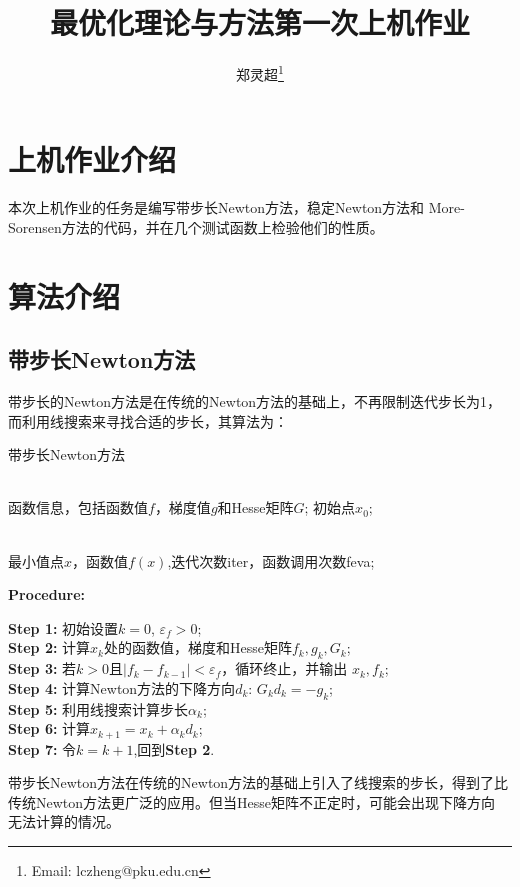 \documentclass[a4paper,  11pt]{ctexart}
\begin{document}
\title{最优化理论与方法第一次上机作业}
\author{郑灵超\thanks{Email: lczheng@pku.edu.cn}}
\maketitle
\section{上机作业介绍}
本次上机作业的任务是编写带步长Newton方法，稳定Newton方法和
More-Sorensen方法的代码，并在几个测试函数上检验他们的性质。
\section{算法介绍}
\subsection{带步长Newton方法}
带步长的Newton方法是在传统的Newton方法的基础上，不再限制迭代步长为1，
而利用线搜索来寻找合适的步长，其算法为：
\begin{algorithm}[H]
\caption{带步长Newton方法}
\begin{algorithmic}[2]
\REQUIRE ~~\\
函数信息，包括函数值$f$，梯度值$g$和Hesse矩阵$G$; \quad 初始点$x_0$;

\ENSURE ~~\\
最小值点$x$，函数值$f(x)$,迭代次数iter，函数调用次数feva;

\hspace{-0.65cm}\textbf{Procedure:}

\textbf{Step 1:}  初始设置$k = 0$, $\varepsilon_f>0$; \\
\textbf{Step 2:}  计算$x_k$处的函数值，梯度和Hesse矩阵$f_k,g_k,G_k$; \\
\textbf{Step 3:}  若$k>0$且$|f_{k}-f_{k-1}|<\varepsilon_f$，循环终止，并输出
$x_k,f_k$;\\
\textbf{Step 4:}  计算Newton方法的下降方向$d_k$: $G_kd_k=-g_k$;\\
\textbf{Step 5:}  利用线搜索计算步长$\alpha_k$;\\
\textbf{Step 6:}  计算$x_{k+1}=x_k+\alpha_kd_k$; \\
\textbf{Step 7:}  令$k=k+1$,回到\textbf{Step 2}.
\end{algorithmic}
\end{algorithm}
带步长Newton方法在传统的Newton方法的基础上引入了线搜索的步长，得到了比
传统Newton方法更广泛的应用。但当Hesse矩阵不正定时，可能会出现下降方向
无法计算的情况。
\end{document}

